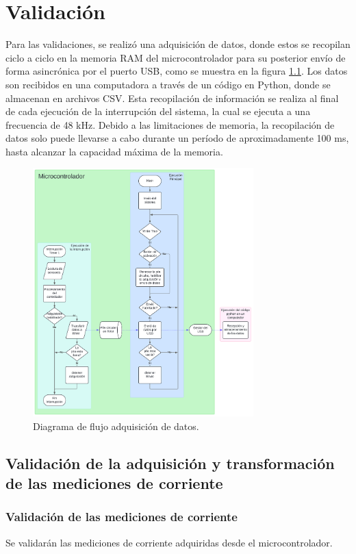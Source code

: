 \documentclass[11pt]{report}
\begin{document}
\newpage
\chapter{Validación}
Para las validaciones, se realizó una adquisición de datos, donde estos se recopilan ciclo a ciclo en la memoria RAM del microcontrolador para su posterior envío de forma asincrónica por el puerto USB, como se muestra en la figura \ref{flujo_debug}. Los datos son recibidos en una computadora a través de un código en Python, donde se almacenan en archivos CSV. Esta recopilación de información se realiza al final de cada ejecución de la interrupción del sistema, la cual se ejecuta a una frecuencia de 48 kHz. Debido a las limitaciones de memoria, la recopilación de datos solo puede llevarse a cabo durante un período de aproximadamente 100 ms, hasta alcanzar la capacidad máxima de la memoria.

\begin{figure}[ht]
	\centering
	\includegraphics[width=0.76\textwidth]{imagenes/Diagramas/Debug USB.png}
	\caption{Diagrama de flujo adquisición de datos.}
	\label{flujo_debug}
\end{figure}
\FloatBarrier

\section{Validación de la adquisición y transformación de las mediciones de corriente}

\subsection{Validación de las mediciones de corriente}
Se validarán las mediciones de corriente adquiridas desde el microcontrolador.
\end{document}
